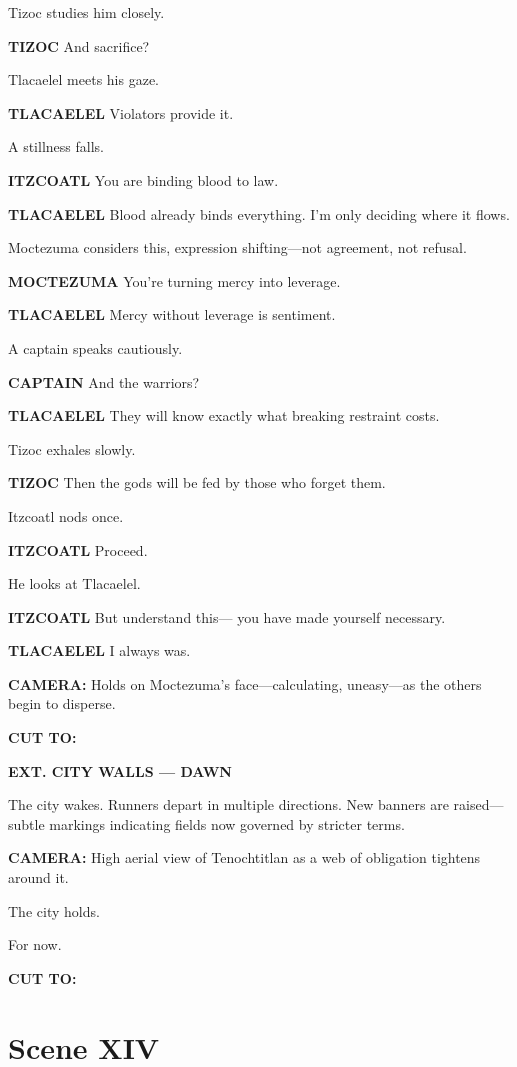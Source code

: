 \documentclass[12pt]{article}
\begin{document}
Tizoc studies him closely.

\textbf{TIZOC}  
And sacrifice?

Tlacaelel meets his gaze.

\textbf{TLACAELEL}  
Violators provide it.

A stillness falls.

\textbf{ITZCOATL}  
You are binding blood to law.

\textbf{TLACAELEL}  
Blood already binds everything.  
I’m only deciding where it flows.

Moctezuma considers this, expression shifting—not agreement, not refusal.

\textbf{MOCTEZUMA}  
You’re turning mercy into leverage.

\textbf{TLACAELEL}  
Mercy without leverage is sentiment.

A captain speaks cautiously.

\textbf{CAPTAIN}  
And the warriors?

\textbf{TLACAELEL}  
They will know exactly  
what breaking restraint costs.

Tizoc exhales slowly.

\textbf{TIZOC}  
Then the gods will be fed  
by those who forget them.

Itzcoatl nods once.

\textbf{ITZCOATL}  
Proceed.

He looks at Tlacaelel.

\textbf{ITZCOATL}  
But understand this—  
you have made yourself necessary.

\textbf{TLACAELEL}  
I always was.

\textbf{CAMERA:} Holds on Moctezuma’s face—calculating, uneasy—as the others begin to disperse.

\textbf{CUT TO:}

\textbf{EXT. CITY WALLS — DAWN}

The city wakes. Runners depart in multiple directions. New banners are raised—subtle markings indicating fields now governed by stricter terms.

\textbf{CAMERA:} High aerial view of Tenochtitlan as a web of obligation tightens around it.

The city holds.

For now.

\textbf{CUT TO:}

\section*{Scene XIV}
\end{document}
